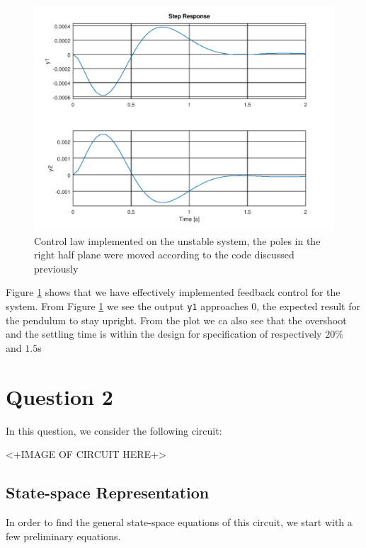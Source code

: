 \documentclass[a4paper, 12pt]{article}
\begin{document}
\begin{figure}[H]
  \centering
  \includegraphics[width=\textwidth]{images/control.png}
  \caption{Control law implemented on the unstable system, the poles in the right half plane were moved according to the code discussed previously}
  \label{fig:control}
\end{figure}

Figure \ref{fig:control} shows that we have effectively implemented feedback control for the system. From Figure \ref{fig:control} we see the output \texttt{y1} approaches $0$, the expected result for the pendulum to stay upright. From the plot we ca also see that the overshoot and the settling time is within the design for specification of respectively $20\%$ and $1.5$s





\section{Question 2}

In this question, we consider the following circuit:

<+IMAGE OF CIRCUIT HERE+>

\subsection{State-space Representation}

In order to find the general state-space equations of this circuit, we start
with a few preliminary equations.
\end{document}

